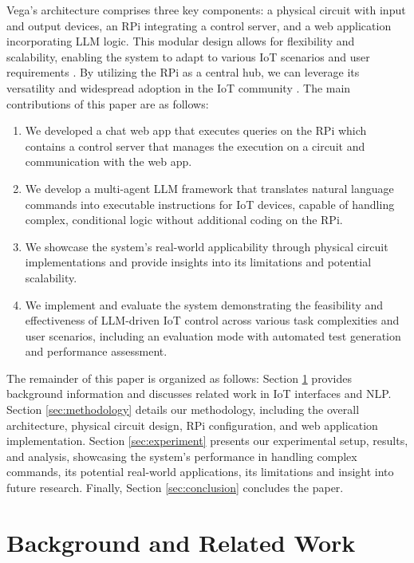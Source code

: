 \documentclass{ieeeaccess}
\begin{document}
Vega's architecture comprises three key components: a physical circuit with input and output devices, an RPi integrating a control server, and a web application incorporating LLM logic. This modular design allows for flexibility and scalability, enabling the system to adapt to various IoT scenarios and user requirements \cite{taylor2010software}. By utilizing the RPi as a central hub, we can leverage its versatility and widespread adoption in the IoT community \cite{8067944}. The main contributions of this paper are as follows:

\begin{enumerate}
\item We developed a chat web app that executes queries on the RPi which contains a control server that manages the execution on a circuit and communication with the web app.
\item We develop a multi-agent LLM framework that translates natural language commands into executable instructions for IoT devices, capable of handling complex, conditional logic without additional coding on the RPi.
\item We showcase the system's real-world applicability through physical circuit implementations and provide insights into its limitations and potential scalability.
\item We implement and evaluate the system demonstrating the feasibility and effectiveness of LLM-driven IoT control across various task complexities and user scenarios, including an evaluation mode with automated test generation and performance assessment.
\end{enumerate}

The remainder of this paper is organized as follows: Section \ref{sec:background} provides background information and discusses related work in IoT interfaces and NLP. Section \ref{sec:methodology} details our methodology, including the overall architecture, physical circuit design, RPi configuration, and web application implementation. Section \ref{sec:experiment} presents our experimental setup, results, and analysis, showcasing the system's performance in handling complex commands, its potential real-world applications, its limitations and insight into future research. Finally, Section \ref{sec:conclusion} concludes the paper.

\section{Background and Related Work}\label{sec:background}
\end{document}
